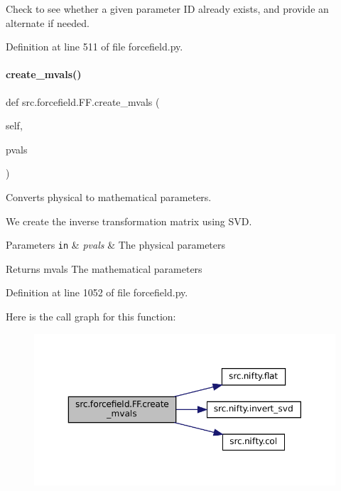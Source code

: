 Check to see whether a given parameter ID already exists, and provide an alternate if needed. 



Definition at line 511 of file forcefield.\+py.

\mbox{\label{classsrc_1_1forcefield_1_1FF_a0f53b3814d92705db25a7d90c4dafca6}} 
\paragraph{\texorpdfstring{create\+\_\+mvals()}{create\_mvals()}}
{\footnotesize\ttfamily def src.\+forcefield.\+F\+F.\+create\+\_\+mvals (\begin{DoxyParamCaption}\item[{}]{self,  }\item[{}]{pvals }\end{DoxyParamCaption})}



Converts physical to mathematical parameters. 

We create the inverse transformation matrix using S\+VD.


\begin{DoxyParams}[1]{Parameters}
\mbox{\tt in}  & {\em pvals} & The physical parameters \\
\hline
\end{DoxyParams}
\begin{DoxyReturn}{Returns}
mvals The mathematical parameters 
\end{DoxyReturn}


Definition at line 1052 of file forcefield.\+py.

Here is the call graph for this function\+:
\nopagebreak
\begin{figure}[H]
\begin{center}
\leavevmode
\includegraphics[width=350pt]{classsrc_1_1forcefield_1_1FF_a0f53b3814d92705db25a7d90c4dafca6_cgraph}
\end{center}
\end{figure}
\mbox{\label{classsrc_1_1forcefield_1_1FF_ad467744db1396ec74adab0c113317d36}} 
